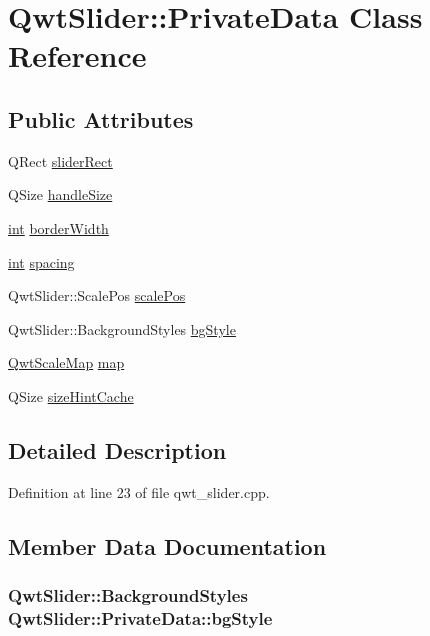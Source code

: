 \hypertarget{class_qwt_slider_1_1_private_data}{\section{Qwt\-Slider\-:\-:Private\-Data Class Reference}
\label{class_qwt_slider_1_1_private_data}
}
\subsection*{Public Attributes}
\begin{DoxyCompactItemize}
\item 
Q\-Rect \hyperlink{class_qwt_slider_1_1_private_data_a063cc546cd8499c3ca49220a8a53f5e6}{slider\-Rect}
\item 
Q\-Size \hyperlink{class_qwt_slider_1_1_private_data_a37a74d8297a3f2626691a52dfd40eaad}{handle\-Size}
\item 
\hyperlink{ioapi_8h_a787fa3cf048117ba7123753c1e74fcd6}{int} \hyperlink{class_qwt_slider_1_1_private_data_a0cfc3742e60634e203ea75b60b244e27}{border\-Width}
\item 
\hyperlink{ioapi_8h_a787fa3cf048117ba7123753c1e74fcd6}{int} \hyperlink{class_qwt_slider_1_1_private_data_ae463e78966bb2344826596fc6353c3a3}{spacing}
\item 
Qwt\-Slider\-::\-Scale\-Pos \hyperlink{class_qwt_slider_1_1_private_data_a4267564888ef0af4e7220104f1385221}{scale\-Pos}
\item 
Qwt\-Slider\-::\-Background\-Styles \hyperlink{class_qwt_slider_1_1_private_data_ad17257056f23adc61a00dbd32fa62905}{bg\-Style}
\item 
\hyperlink{class_qwt_scale_map}{Qwt\-Scale\-Map} \hyperlink{class_qwt_slider_1_1_private_data_a074f0f06d22d98825dc3080cf8e530f4}{map}
\item 
Q\-Size \hyperlink{class_qwt_slider_1_1_private_data_a2bd8a98b114d417a22d76a21626fd0fb}{size\-Hint\-Cache}
\end{DoxyCompactItemize}


\subsection{Detailed Description}


Definition at line 23 of file qwt\-\_\-slider.\-cpp.



\subsection{Member Data Documentation}
\hypertarget{class_qwt_slider_1_1_private_data_ad17257056f23adc61a00dbd32fa62905}{
\subsubsection[{bg\-Style}]{\setlength{\rightskip}{0pt plus 5cm}Qwt\-Slider\-::\-Background\-Styles Qwt\-Slider\-::\-Private\-Data\-::bg\-Style}}\label{class_qwt_slider_1_1_private_data_ad17257056f23adc61a00dbd32fa62905}


